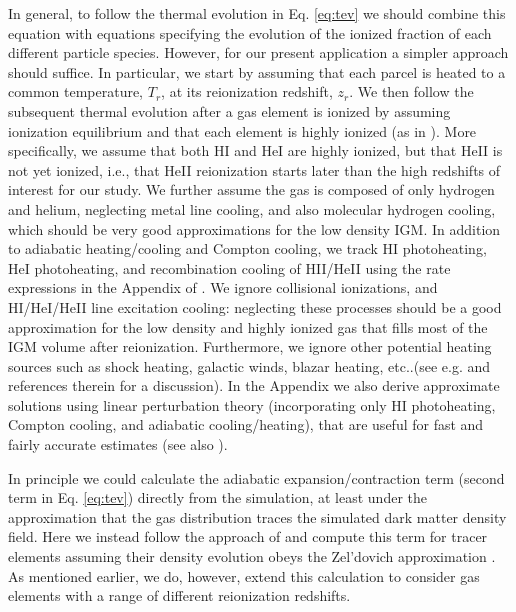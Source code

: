 In general, to follow the thermal evolution in Eq. \ref{eq:tev} we should combine this equation with equations specifying the
evolution of the ionized fraction of each different particle species. However, for our present application a simpler approach should suffice.
In particular, we start by assuming that each parcel is heated to a common temperature, $T_r$, at its reionization redshift, $z_r$. We then 
follow the subsequent
thermal evolution after a gas element is ionized by assuming ionization equilibrium and that each element is highly ionized (as in \citealt{Furlanetto:2009kr}). More specifically,
we assume that both HI and HeI are highly ionized, but that HeII is not yet ionized, i.e., that HeII reionization starts
later than the high redshifts of interest
for our study. We further assume the gas is composed of only hydrogen and helium, neglecting metal line cooling, and also molecular hydrogen cooling,
which should be very good approximations for the low density IGM. In addition to adiabatic heating/cooling and Compton cooling, 
we track HI photoheating, HeI photoheating, and recombination cooling of HII/HeII using the rate expressions in the Appendix
of \citet{Hui:1997dp}. We ignore collisional ionizations, and HI/HeI/HeII line excitation cooling: neglecting these processes should
be a good approximation for the low density and highly ionized gas that fills most of the IGM volume after reionization. Furthermore, we ignore other potential heating sources such as shock heating, galactic winds, blazar heating, etc..(see e.g. \citealt{Hui:2003hn,Chang:2011bf} and references
therein for a discussion). In the Appendix
we also derive approximate solutions using linear perturbation theory (incorporating only HI photoheating, Compton cooling, and
adiabatic cooling/heating), that are useful for fast and fairly accurate estimates (see also \citealt{Hui:1997dp}).

In principle we could calculate the adiabatic expansion/contraction term (second term in Eq. \ref{eq:tev}) directly from the \citet{McQuinn:2007dy} 
simulation, at least
under the approximation that the gas distribution traces the simulated dark matter density field. Here we instead follow the approach of
\citet{Hui:1997dp} and compute this term for tracer elements assuming their density evolution obeys the Zel'dovich approximation \citep{1970A&A.....5...84Z}.
As mentioned earlier, we do, however, extend this calculation to consider gas elements with a range of different reionization redshifts. 

